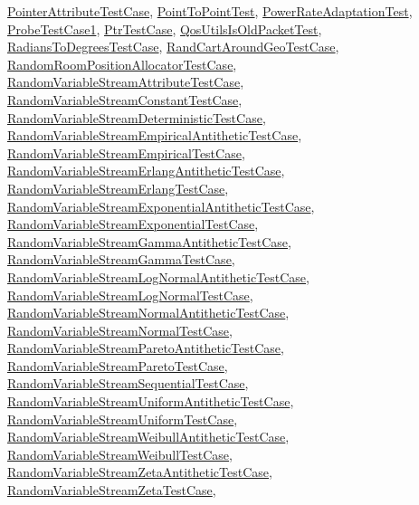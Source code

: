\hyperlink{classPointerAttributeTestCase}{Pointer\+Attribute\+Test\+Case}, \hyperlink{classPointToPointTest}{Point\+To\+Point\+Test}, \hyperlink{classPowerRateAdaptationTest}{Power\+Rate\+Adaptation\+Test}, \hyperlink{classProbeTestCase1}{Probe\+Test\+Case1}, \hyperlink{classPtrTestCase}{Ptr\+Test\+Case}, \hyperlink{classQosUtilsIsOldPacketTest}{Qos\+Utils\+Is\+Old\+Packet\+Test}, \hyperlink{classRadiansToDegreesTestCase}{Radians\+To\+Degrees\+Test\+Case}, \hyperlink{classRandCartAroundGeoTestCase}{Rand\+Cart\+Around\+Geo\+Test\+Case}, \hyperlink{classRandomRoomPositionAllocatorTestCase}{Random\+Room\+Position\+Allocator\+Test\+Case}, \hyperlink{classRandomVariableStreamAttributeTestCase}{Random\+Variable\+Stream\+Attribute\+Test\+Case}, \hyperlink{classRandomVariableStreamConstantTestCase}{Random\+Variable\+Stream\+Constant\+Test\+Case}, \hyperlink{classRandomVariableStreamDeterministicTestCase}{Random\+Variable\+Stream\+Deterministic\+Test\+Case}, \hyperlink{classRandomVariableStreamEmpiricalAntitheticTestCase}{Random\+Variable\+Stream\+Empirical\+Antithetic\+Test\+Case}, \hyperlink{classRandomVariableStreamEmpiricalTestCase}{Random\+Variable\+Stream\+Empirical\+Test\+Case}, \hyperlink{classRandomVariableStreamErlangAntitheticTestCase}{Random\+Variable\+Stream\+Erlang\+Antithetic\+Test\+Case}, \hyperlink{classRandomVariableStreamErlangTestCase}{Random\+Variable\+Stream\+Erlang\+Test\+Case}, \hyperlink{classRandomVariableStreamExponentialAntitheticTestCase}{Random\+Variable\+Stream\+Exponential\+Antithetic\+Test\+Case}, \hyperlink{classRandomVariableStreamExponentialTestCase}{Random\+Variable\+Stream\+Exponential\+Test\+Case}, \hyperlink{classRandomVariableStreamGammaAntitheticTestCase}{Random\+Variable\+Stream\+Gamma\+Antithetic\+Test\+Case}, \hyperlink{classRandomVariableStreamGammaTestCase}{Random\+Variable\+Stream\+Gamma\+Test\+Case}, \hyperlink{classRandomVariableStreamLogNormalAntitheticTestCase}{Random\+Variable\+Stream\+Log\+Normal\+Antithetic\+Test\+Case}, \hyperlink{classRandomVariableStreamLogNormalTestCase}{Random\+Variable\+Stream\+Log\+Normal\+Test\+Case}, \hyperlink{classRandomVariableStreamNormalAntitheticTestCase}{Random\+Variable\+Stream\+Normal\+Antithetic\+Test\+Case}, \hyperlink{classRandomVariableStreamNormalTestCase}{Random\+Variable\+Stream\+Normal\+Test\+Case}, \hyperlink{classRandomVariableStreamParetoAntitheticTestCase}{Random\+Variable\+Stream\+Pareto\+Antithetic\+Test\+Case}, \hyperlink{classRandomVariableStreamParetoTestCase}{Random\+Variable\+Stream\+Pareto\+Test\+Case}, \hyperlink{classRandomVariableStreamSequentialTestCase}{Random\+Variable\+Stream\+Sequential\+Test\+Case}, \hyperlink{classRandomVariableStreamUniformAntitheticTestCase}{Random\+Variable\+Stream\+Uniform\+Antithetic\+Test\+Case}, \hyperlink{classRandomVariableStreamUniformTestCase}{Random\+Variable\+Stream\+Uniform\+Test\+Case}, \hyperlink{classRandomVariableStreamWeibullAntitheticTestCase}{Random\+Variable\+Stream\+Weibull\+Antithetic\+Test\+Case}, \hyperlink{classRandomVariableStreamWeibullTestCase}{Random\+Variable\+Stream\+Weibull\+Test\+Case}, \hyperlink{classRandomVariableStreamZetaAntitheticTestCase}{Random\+Variable\+Stream\+Zeta\+Antithetic\+Test\+Case}, \hyperlink{classRandomVariableStreamZetaTestCase}{Random\+Variable\+Stream\+Zeta\+Test\+Case}, 